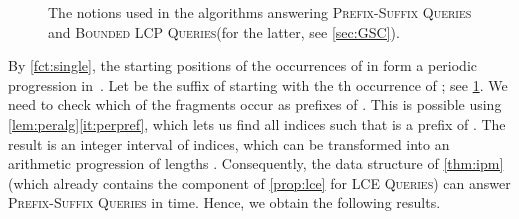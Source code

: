 \documentclass[a4paper]{article}
\theoremstyle{definition}
\theoremstyle{remark}
\newcommand{\BQ}{\textsc{Prefix-Suffix Queries}\xspace}
\newcommand{\BLCP}{\textsc{Bounded LCP Queries}\xspace}
\newcommand{\LCEQ}{\textsc{LCE Queries}\xspace}
\begin{document}
\begin{figure}[ht]
\begin{center}
\end{center}
 \caption{The notions used in the algorithms answering \BQ and \BLCP (for the latter, see \cref{sec:GSC}).}\label{fig:app-blcp}
\end{figure}

By \cref{fct:single}, the starting positions of the occurrences of  in  form a periodic progression in~.
Let  be the suffix of  starting with the th occurrence of ; see \cref{fig:app-blcp}.
We need to check which of the fragments  occur as prefixes of .
This is possible using \cref{lem:peralg}\ref{it:perpref}, which lets us find all indices  such that  is a prefix of .
The result is an integer interval of indices, which can be transformed into an arithmetic progression of lengths .
Consequently, the data structure of \cref{thm:ipm} (which already contains the component of \cref{prop:lce} for \LCEQ) can answer \BQ in  time.
Hence, we obtain the following results.
\end{document}
